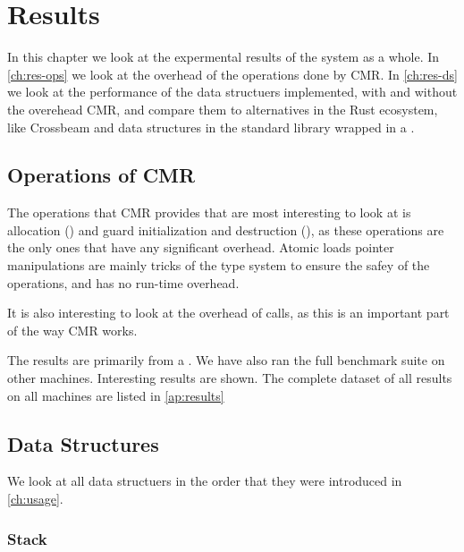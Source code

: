 \chapter{Results\label{ch:results}}

In this chapter we look at the expermental results of the system as a whole. In \cref{ch:res-ops}
we look at the overhead of the operations done by CMR. In \cref{ch:res-ds} we look at the
performance of the data structuers implemented, with and without the overehead CMR, and compare
them to alternatives in the Rust ecosystem, like Crossbeam\cite{crossbeam} and data structures in
the standard library wrapped in a .

\section{Operations of CMR\label{ch:res-ops}}

The operations that CMR provides that are most interesting to look at is allocation
() and guard initialization and destruction (), as these operations
are the only ones that have any significant overhead. Atomic loads pointer manipulations are mainly
tricks of the type system to ensure the safey of the operations, and has no run-time overhead.

It is also interesting to look at the overhead of  calls, as this is an important part
of the way CMR works.


The results are primarily from a . We have also ran the
full benchmark suite on other machines.
Interesting results are shown. The complete dataset of all results on all machines are listed in
\cref{ap:results}


\section{Data Structures\label{ch:res-ds}}

We look at all data structuers in the order that they were introduced in \cref{ch:usage}.


\clearpage
\subsection{Stack\label{sec:res-stack}}

